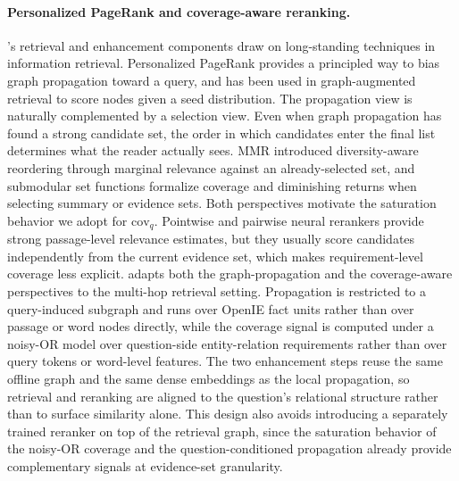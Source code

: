 \paragraph{Personalized PageRank and coverage-aware reranking.}
\methodname{}'s retrieval and enhancement components draw on
long-standing techniques in information retrieval. Personalized
PageRank \citep{haveliwala2002topic,jeh2003scaling} provides a
principled way to bias graph propagation toward a query, and has been
used in graph-augmented retrieval to score nodes given a seed
distribution. The propagation view is naturally complemented by a
selection view. Even when graph propagation has found a strong
candidate set, the order in which candidates enter the final list
determines what the reader actually sees. MMR \citep{carbonell1998mmr}
introduced diversity-aware reordering through marginal relevance
against an already-selected set, and submodular set functions
\citep{lin2011submodular} formalize coverage and diminishing returns
when selecting summary or evidence sets. Both perspectives motivate the
saturation behavior we adopt for $\mathrm{cov}_q$. Pointwise and
pairwise neural rerankers provide strong passage-level relevance
estimates, but they usually score candidates independently from the
current evidence set, which makes requirement-level coverage less
explicit. \methodname{} adapts both the graph-propagation and the
coverage-aware perspectives to the multi-hop retrieval setting.
Propagation is restricted to a query-induced subgraph and runs over
OpenIE fact units rather than over passage or word nodes directly,
while the coverage signal is computed under a noisy-OR model over
question-side entity-relation requirements rather than over query
tokens or word-level features. The two enhancement steps reuse the
same offline graph and the same dense embeddings as the local
propagation, so retrieval and reranking are aligned to the question's
relational structure rather than to surface similarity alone. This
design also avoids introducing a separately trained reranker on top of
the retrieval graph, since the saturation behavior of the noisy-OR
coverage and the question-conditioned propagation already provide
complementary signals at evidence-set granularity.
